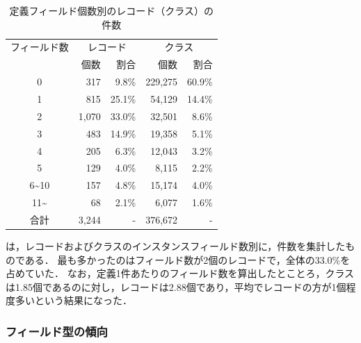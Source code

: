 \begin{table}[t]
    \caption{定義フィールド個数別のレコード（クラス）の件数}
    \label{num_fields}
    \centering
    \begin{tabular}{c||r|r|r|r}
        \hline
        フィールド数 & \multicolumn{2}{c|}{レコード} & \multicolumn{2}{c}{クラス}\\
         & 個数 & 割合 & 個数 & 割合\\
        \hline\hline
        0 & 317 & 9.8\% & 229,275 & 60.9\%\\
        1 & 815 & 25.1\% & 54,129 & 14.4\%\\
        2 & 1,070 & 33.0\% & 32,501 & 8.6\%\\
        3 & 483 & 14.9\% & 19,358 & 5.1\%\\
        4 & 205 & 6.3\% & 12,043 & 3.2\%\\
        5 & 129 & 4.0\% & 8,115 & 2.2\%\\
        6\textasciitilde10 & 157 & 4.8\% & 15,174 & 4.0\%\\
        11\textasciitilde & 68 & 2.1\% & 6,077 & 1.6\%\\
        \hline
        合計 & 3,244 & - & 376,672 & - \\
        \hline
    \end{tabular}
\end{table}

は，レコードおよびクラスのインスタンスフィールド数別に，件数を集計したものである．
最も多かったのはフィールド数が2個のレコードで，全体の33.0\%を占めていた．
なお，定義1件あたりのフィールド数を算出したとことろ，クラスは1.85個であるのに対し，レコードは2.88個であり，平均でレコードの方が1個程度多いという結果になった．

\subsubsection{フィールド型の傾向\label{field_type_trend}}

